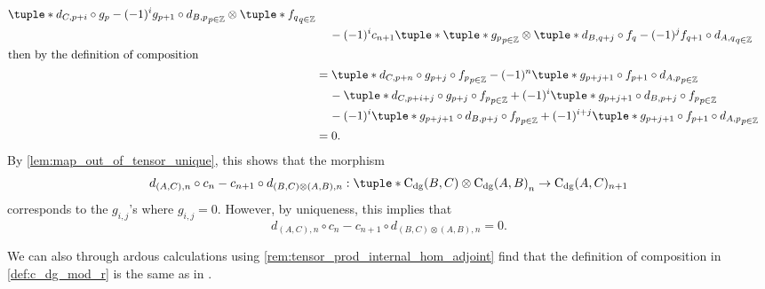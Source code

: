 \begin{remark}
\begin{enumerate}
{\begin{align*}
{                    \tuple*{
                        d_{C, p + i} \circ g_p - (-1)^i g_{p + 1} \circ d_{B, p}
                    }_{p \in \Zb} \otimes \tuple*{ f_q }_{q \in \Zb}
                } \\
                &\hspace{0.4cm} - (-1)^i c_{n + 1} \tuple*{
                    \tuple*{ g_p }_{p \in \Zb} \otimes \tuple*{
                        d_{B, q + j} \circ f_q - (-1)^j f_{q + 1} \circ d_{A, q}
                    }_{q \in \Zb}
                } \\
                \intertext{then by the definition of composition}
                &= \tuple*{
                    d_{C, p + n} \circ g_{p + j} \circ f_p
                }_{p \in \Zb} - (-1)^n \tuple*{
                    g_{p + j + 1} \circ f_{p + 1} \circ d_{A, p}
                }_{p \in \Zb} \\
                &\hspace{0.4cm} - \tuple*{
                    d_{C, p + i + j} \circ g_{p + j} \circ f_p
                }_{p \in \Zb} + (-1)^i \tuple*{
                    g_{p + j + 1} \circ d_{B, p + j} \circ f_p
                }_{p \in \Zb} \\
                &\hspace{0.4cm} - (-1)^i \tuple*{
                    g_{p + j + 1} \circ d_{B, p + j} \circ f_p
                }_{p \in \Zb} + (-1)^{i + j} \tuple*{
                    g_{p + j + 1} \circ f_{p + 1} \circ d_{A, p}
                }_{p \in \Zb} \\
                &= 0.
            \end{align*}
            By \autoref{lem:map_out_of_tensor_unique}, this shows that the morphism
            \[
                d_{(A, C), n} \circ c_n - c_{n + 1} \circ d_{(B, C) \otimes (A, B), n}: \\
                \tuple*{ \C_{\dg}(B, C) \otimes \C_{\dg}(A, B) }_n \to \C_{\dg}(A, C)_{n + 1}
            \]         
            corresponds to the \( g_{i,j} \)'s where \( g_{i, j} = 0 \). However, by uniqueness, this implies that
            \[
                d_{(A, C), n} \circ c_n - c_{n + 1} \circ d_{(B, C) \otimes (A, B), n} = 0.
            \]
        }
    \end{enumerate}
\end{remark}

We can also through ardous calculations using \autoref{rem:tensor_prod_internal_hom_adjoint} find that the definition of composition in \autoref{def:c_dg_mod_r} is the same as in \cite[p. 295]{Borceux_1994}.

